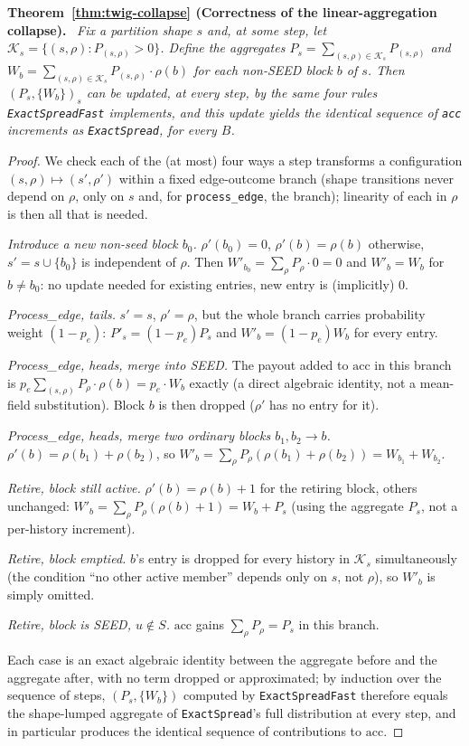 \documentclass[ASNA,number]{USG}
\newenvironment{repeattheorem}[1][]{\par\medskip\noindent\textbf{#1.}\ \itshape}{\par\medskip}
\begin{document}
\begin{repeattheorem}[Theorem~\ref{thm:twig-collapse} (Correctness of the linear-aggregation collapse)]
Fix a partition shape $s$ and, at some step, let
$\mathcal K_s=\{(s,\rho):P_{(s,\rho)}>0\}$. Define the aggregates
$P_s=\sum_{(s,\rho)\in\mathcal K_s}P_{(s,\rho)}$ and
$W_b=\sum_{(s,\rho)\in\mathcal K_s}P_{(s,\rho)}\cdot\rho(b)$ for each
non-SEED block $b$ of $s$. Then $(P_s,\{W_b\})_s$ can be updated, at every
step, by the same four rules \texttt{ExactSpreadFast} implements, and this
update yields the identical sequence of \texttt{acc} increments as
\texttt{ExactSpread}, for every $B$.
\end{repeattheorem}
\begin{proof}
We check each of the (at most) four ways a step transforms a configuration
$(s,\rho)\mapsto(s',\rho')$ within a fixed edge-outcome branch (shape
transitions never depend on $\rho$, only on $s$ and, for
\texttt{process\_edge}, the branch); linearity of each in $\rho$ is then
all that is needed.

\emph{Introduce a new non-seed block $b_0$.} $\rho'(b_0)=0$,
$\rho'(b)=\rho(b)$ otherwise, $s'=s\cup\{b_0\}$ is independent of $\rho$.
Then $W'_{b_0}=\sum_\rho P_\rho\cdot 0=0$ and $W'_b=W_b$ for $b\ne b_0$: no
update needed for existing entries, new entry is (implicitly) $0$.

\emph{Process\_edge, tails.} $s'=s$, $\rho'=\rho$, but the whole branch
carries probability weight $(1-p_e)$: $P'_s=(1-p_e)P_s$ and
$W'_b=(1-p_e)W_b$ for every entry.

\emph{Process\_edge, heads, merge into SEED.} The payout added to
$\mathrm{acc}$ in this branch is
$p_e\sum_{(s,\rho)}P_\rho\cdot\rho(b)=p_e\cdot W_b$ exactly (a direct
algebraic identity, not a mean-field substitution). Block $b$ is then
dropped ($\rho'$ has no entry for it).

\emph{Process\_edge, heads, merge two ordinary blocks $b_1,b_2\to b$.}
$\rho'(b)=\rho(b_1)+\rho(b_2)$, so
$W'_b=\sum_\rho P_\rho(\rho(b_1)+\rho(b_2))=W_{b_1}+W_{b_2}$.

\emph{Retire, block still active.} $\rho'(b)=\rho(b)+1$ for the retiring
block, others unchanged: $W'_b=\sum_\rho P_\rho(\rho(b)+1)=W_b+P_s$ (using
the aggregate $P_s$, not a per-history increment).

\emph{Retire, block emptied.} $b$'s entry is dropped for every history in
$\mathcal K_s$ simultaneously (the condition ``no other active member''
depends only on $s$, not $\rho$), so $W'_b$ is simply omitted.

\emph{Retire, block is SEED, $u\notin S$.} $\mathrm{acc}$ gains
$\sum_\rho P_\rho=P_s$ in this branch.

Each case is an exact algebraic identity between the aggregate before and
the aggregate after, with no term dropped or approximated; by induction
over the sequence of steps, $(P_s,\{W_b\})$ computed by
\texttt{ExactSpreadFast} therefore equals the shape-lumped aggregate of
\texttt{ExactSpread}'s full distribution at every step, and in particular
produces the identical sequence of contributions to $\mathrm{acc}$.
\end{proof}
\end{document}
